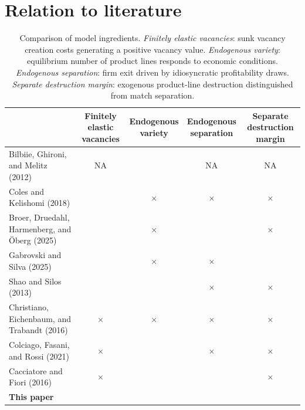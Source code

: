 \documentclass[authoryear, review, 12pt]{elsarticle}
\begin{document}
	\section{Relation to literature} 
	\begin{table}[H]
		\centering
		\footnotesize
		\setlength{\tabcolsep}{0.15cm}
		\begin{tabular}{l|cccc}
			\toprule
			& \makecell{Finitely elastic\\ vacancies} 
			& \makecell{Endogenous\\variety} 
			& \makecell{Endogenous\\separation} 
			& \makecell{Separate destruction\\margin} \\
			\midrule
			Bilbiie, Ghironi, and Melitz (2012) 
			& NA & \checkmark & NA & NA \\
			Coles and Kelishomi (2018) 
			& \checkmark & $\times$ & $\times$ & $\times$ \\
			Broer, Druedahl, Harmenberg, and \"{O}berg (2025) 
			& \checkmark & $\times$ & \checkmark & $\times$ \\
			Gabrovski and Silva (2025) 
			& \checkmark & $\times$ & $\times$ & \checkmark \\
			Shao and Silos (2013) 
			& \checkmark & \checkmark & $\times$ & $\times$ \\
			Christiano, Eichenbaum, and Trabandt (2016) 
			& $\times$ & $\times$ & $\times$ & $\times$ \\
			Colciago, Fasani, and Rossi (2021) 
			& $\times$ & \checkmark & $\times$ & $\times$ \\
			Cacciatore and Fiori (2016) 
			& $\times$ & \checkmark & \checkmark & $\times$ \\
			\textbf{This paper} 
			& \checkmark & \checkmark & \checkmark & \checkmark \\
			\bottomrule
		\end{tabular}
		\caption{Comparison of model ingredients. 
			\emph{Finitely elastic vacancies}: sunk vacancy creation 
			costs generating a positive vacancy value. 
			\emph{Endogenous variety}: equilibrium number of product 
			lines responds to economic conditions. 
			\emph{Endogenous separation}: firm exit driven by 
			idiosyncratic profitability draws. 
			\emph{Separate destruction margin}: exogenous product-line 
			destruction distinguished from match separation.}
		\label{tab:ingredients_comparison}
	\end{table}
\end{document}

